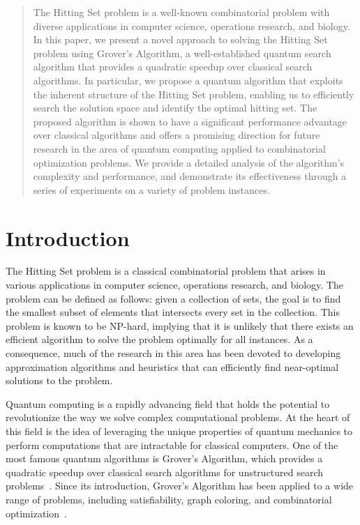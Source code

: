 \begin{abstract}
The Hitting Set problem is a well-known combinatorial problem with diverse applications in computer science, operations research, and biology. In this paper, we present a novel approach to solving the Hitting Set problem using Grover's Algorithm, a well-established quantum search algorithm that provides a quadratic speedup over classical search algorithms. In particular, we propose a quantum algorithm that exploits the inherent structure of the Hitting Set problem, enabling us to efficiently search the solution space and identify the optimal hitting set. The proposed algorithm is shown to have a significant performance advantage over classical algorithms and offers a promising direction for future research in the area of quantum computing applied to combinatorial optimization problems. We provide a detailed analysis of the algorithm's complexity and performance, and demonstrate its effectiveness through a series of experiments on a variety of problem instances.
\end{abstract}

\section{Introduction}
The Hitting Set problem is a classical combinatorial problem that arises in various applications in computer science, operations research, and biology. The problem can be defined as follows: given a collection of sets, the goal is to find the smallest subset of elements that intersects every set in the collection. This problem is known to be NP-hard, implying that it is unlikely that there exists an efficient algorithm to solve the problem optimally for all instances. As a consequence, much of the research in this area has been devoted to developing approximation algorithms and heuristics that can efficiently find near-optimal solutions to the problem.

Quantum computing is a rapidly advancing field that holds the potential to revolutionize the way we solve complex computational problems. At the heart of this field is the idea of leveraging the unique properties of quantum mechanics to perform computations that are intractable for classical computers. One of the most famous quantum algorithms is Grover's Algorithm, which provides a quadratic speedup over classical search algorithms for unstructured search problems~\cite{grover1996fast}. Since its introduction, Grover's Algorithm has been applied to a wide range of problems, including satisfiability, graph coloring, and combinatorial optimization~\cite{shor1997polynomial,childs2017quantum,ambainis2019quantum}.

